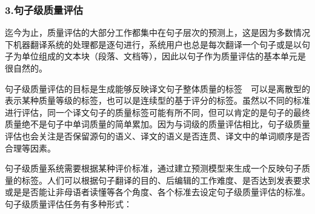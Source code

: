 
\subsubsection{3.句子级质量评估}

\parinterval 迄今为止，质量评估的大部分工作都集中在句子层次的预测上，这是因为多数情况下机器翻译系统的处理都是逐句进行，系统用户也总是每次翻译一个句子或是以句子为单位组成的文本块（段落、文档等），因此以句子作为质量评估的基本单元是很自然的。

\parinterval 句子级质量评估的目标是生成能够反映译文句子整体质量的标签\ \dash \ 可以是离散型的表示某种质量等级的标签，也可以是连续型的基于评分的标签。虽然以不同的标准进行评估，同一个译文句子的质量标签可能有所不同，但可以肯定的是句子的最终质量绝不是句子中单词质量的简单累加。因为与词级的质量评估相比，句子级质量评估也会关注是否保留源句的语义、译文的语义是否连贯、译文中的单词顺序是否合理等因素。

\parinterval 句子级质量系统需要根据某种评价标准，通过建立预测模型来生成一个反映句子质量的标签。人们可以根据句子翻译的目的、后编辑的工作难度、是否达到发表要求或是是否能让非母语者读懂等各个角度、各个标准去设定句子级质量评估的标准。句子级质量评估任务有多种形式：

